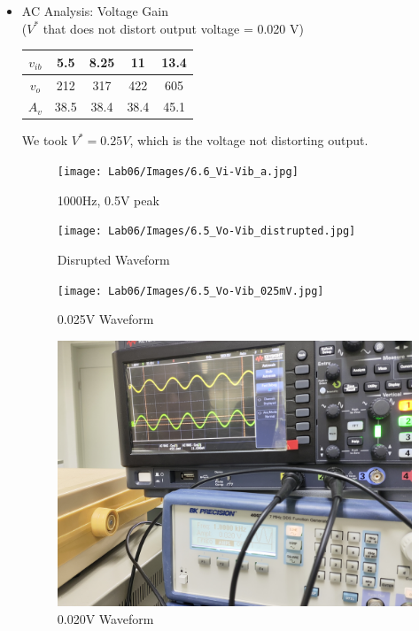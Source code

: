 \begin{itemize}
    \item AC Analysis: Voltage Gain\\
    ($V^*$ that does not distort output voltage = 0.020 V)\par
    \begin{table}[h]
    \centering
        \begin{tabular}{|c|c|c|c|c|}
        \hline
        $v_{ib}$ & 5.5  & 8.25 & 11   & 13.4 \\ \hline
        $v_o$    & 212  & 317  & 422  & 605  \\ \hline
        $A_v$    & 38.5 & 38.4 & 38.4 & 45.1 \\ \hline
    \end{tabular}
    \end{table}
    \FloatBarrier
    We took $V^* = 0.25V$, which is the voltage not distorting output.
    \FloatBarrier
    \begin{figure}[h]
        \centering
        \texttt{[image: Lab06/Images/6.6\_Vi-Vib\_a.jpg]}
        \caption{1000Hz, 0.5V peak}
        \label{l6acvg}
    \end{figure}
    \FloatBarrier
    \begin{figure}[h]
        \centering
        \texttt{[image: Lab06/Images/6.5\_Vo-Vib\_distrupted.jpg]}
        \caption{Disrupted Waveform}
        \label{l6dcdisrupted}
    \end{figure}
    \FloatBarrier
    \begin{figure}[h]
        \centering
        \texttt{[image: Lab06/Images/6.5\_Vo-Vib\_025mV.jpg]}
        \caption{0.025V Waveform}
        \label{l6dc025}
    \end{figure}
    \FloatBarrier
    \begin{figure}
        \centering
        \includegraphics[width=0.5\linewidth]{Lab06/Images/6.5_Vo-Vib_020mV.jpg}
        \caption{0.020V Waveform}
        \label{l6dc020}
    \end{figure}
    \FloatBarrier
    \begin{figure}
        \centering

\end{figure}
\end{itemize}
